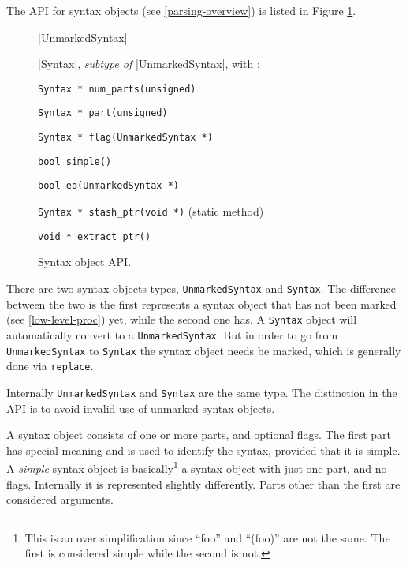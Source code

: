 The API for syntax objects (see \ref{parsing-overview}) is
listed in Figure \ref{syntax-abi}.
\begin{figure}
\begin{apil}
\item {} |UnmarkedSyntax|
\item {} |Syntax|, \textit{subtype of} |UnmarkedSyntax|, with :
\begin{apill}
\item \verb/Syntax * num_parts(unsigned)/
\item \verb/Syntax * part(unsigned)/
\item \verb/Syntax * flag(UnmarkedSyntax *)/
\item \verb/bool simple()/
\item \verb/bool eq(UnmarkedSyntax *)/
\item \verb/Syntax * stash_ptr(void *)/ (static method)
\item \verb/void * extract_ptr()/
\end{apill}
\end{apil}
\caption{Syntax object API.}
\label{syntax-abi}
\end{figure}
There are two syntax-objects types, \verb/UnmarkedSyntax/ and
\verb/Syntax/.  The difference between the two is the first represents
a syntax object that has not been marked (see \ref{low-level-proc}) yet, 
while the second one
has.  A \verb/Syntax/ object will automatically convert to a
\verb/UnmarkedSyntax/.  But in order to go from \verb/UnmarkedSyntax/
to \verb/Syntax/ the syntax object needs be marked, which is generally
done via \verb/replace/.

Internally \verb/UnmarkedSyntax/ and \verb/Syntax/ are the same type.
The distinction in the API is to avoid invalid use of unmarked syntax
objects.

A syntax object consists of one or more parts, and optional flags.
The first part has special meaning and is used to identify the syntax,
provided that it is simple.  A \textit{simple} syntax object is
basically\footnote{This is an over simplification since ``foo'' and
  ``(foo)'' are not the same.  The first is considered simple while
  the second is not.} a syntax object with just one part, and no
flags.  Internally it is represented slightly differently.  Parts
other than the first are considered arguments.

